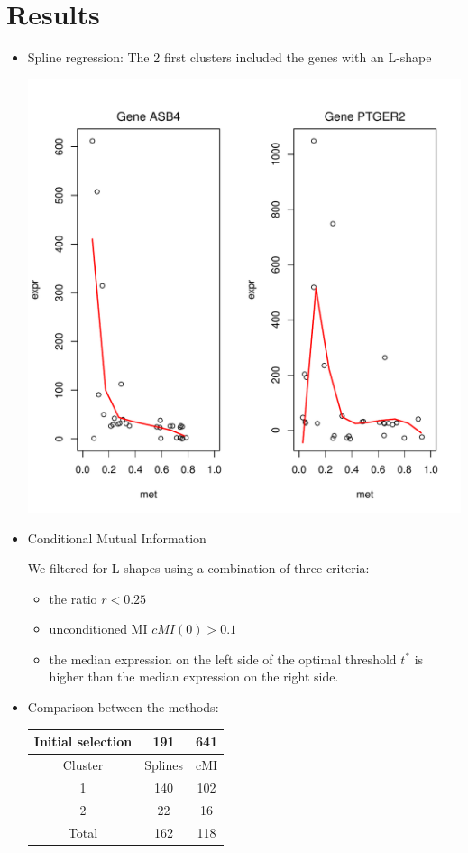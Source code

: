 \section{Results}

\begin {itemize}
\item Spline regression:
 The 2 first clusters included the genes with an L-shape

\begin{center}
\includegraphics[width=0.3\columnwidth]{./images/grafic_two_patterns.pdf}
\end{center}

\item Conditional Mutual Information

We filtered for L-shapes using a combination of three criteria:
\begin{itemize}
\item the ratio $r<0.25$
\item unconditioned MI $\mathit{cMI}(0)>0.1$
\item the median expression on the left side of the optimal threshold $t^{\ast}$ is higher
than the median expression on the right side.
\end{itemize}


\item Comparison between the methods:
\begin{center}
\begin{tabular}{|c|c|c|}
\hline
Initial selection & 191 & 641 \\
\hline
\hline
Cluster & Splines & cMI \\
\hline
1 & 140 & 102 \\
2 & 22 & 16 \\
\hline
Total & 162 & 118 \\
\hline 
\end{tabular}
\end{center}


\end{itemize}
